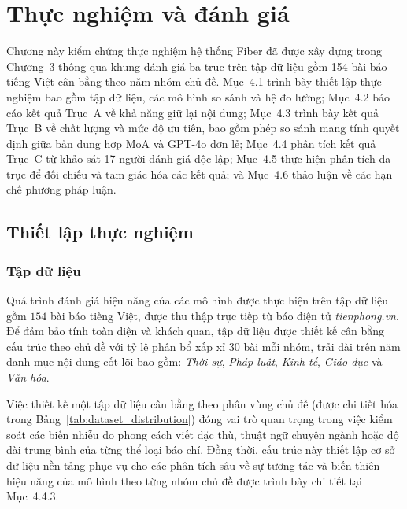 \chapter{Thực nghiệm và đánh giá}

Chương này kiểm chứng thực nghiệm hệ thống Fiber đã được xây dựng trong Chương~3 thông qua khung đánh giá ba trục trên tập dữ liệu gồm 154 bài báo tiếng Việt cân bằng theo năm nhóm chủ đề. Mục~4.1 trình bày thiết lập thực nghiệm bao gồm tập dữ liệu, các mô hình so sánh và hệ đo lường; Mục~4.2 báo cáo kết quả Trục~A về khả năng giữ lại nội dung; Mục~4.3 trình bày kết quả Trục~B về chất lượng và mức độ ưu tiên, bao gồm phép so sánh mang tính quyết định giữa bản dung hợp MoA và GPT-4o đơn lẻ; Mục~4.4 phân tích kết quả Trục~C từ khảo sát 17 người đánh giá độc lập; Mục~4.5 thực hiện phân tích đa trục để đối chiếu và tam giác hóa các kết quả; và Mục~4.6 thảo luận về các hạn chế phương pháp luận.

\section{Thiết lập thực nghiệm}

\subsection{Tập dữ liệu}

Quá trình đánh giá hiệu năng của các mô hình được thực hiện trên tập dữ liệu gồm $154$ bài báo tiếng Việt, được thu thập trực tiếp từ báo điện tử \textit{tienphong.vn}. Để đảm bảo tính toàn diện và khách quan, tập dữ liệu được thiết kế cân bằng cấu trúc theo chủ đề với tỷ lệ phân bổ xấp xỉ $30$ bài mỗi nhóm, trải dài trên năm danh mục nội dung cốt lõi bao gồm: \textit{Thời sự}, \textit{Pháp luật}, \textit{Kinh tế}, \textit{Giáo dục} và \textit{Văn hóa}. 

Việc thiết kế một tập dữ liệu cân bằng theo phân vùng chủ đề (được chi tiết hóa trong Bảng~\ref{tab:dataset_distribution}) đóng vai trò quan trọng trong việc kiểm soát các biến nhiễu do phong cách viết đặc thù, thuật ngữ chuyên ngành hoặc độ dài trung bình của từng thể loại báo chí. Đồng thời, cấu trúc này thiết lập cơ sở dữ liệu nền tảng phục vụ cho các phân tích sâu về sự tương tác và biến thiên hiệu năng của mô hình theo từng nhóm chủ đề được trình bày chi tiết tại Mục~4.4.3.

